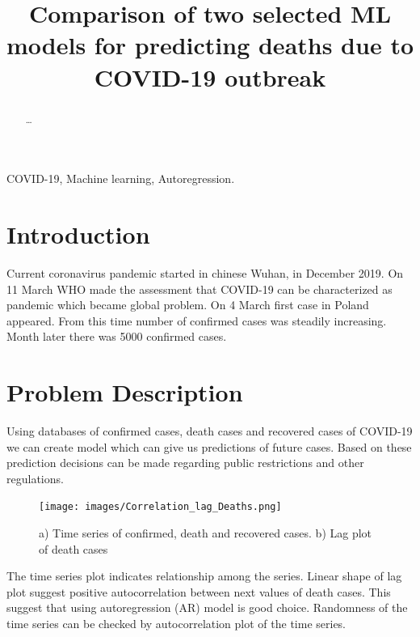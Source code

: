\documentclass[conference]{IEEEtran}
\begin{document}
\title{Comparison of two selected ML models for predicting deaths due to COVID-19 outbreak}

\author{
\and
{}
}


\maketitle

\begin{abstract}
\dots
\end{abstract}

\begin{IEEEkeywords}
COVID-19, Machine learning, Autoregression.
\end{IEEEkeywords}

\section{Introduction}
Current coronavirus pandemic started in chinese Wuhan, in December 2019. On 11 March WHO made the assessment that COVID-19 can be
 characterized as pandemic which became global problem. On 4 March first case in Poland appeared. From this time number of confirmed cases was steadily increasing.
 Month later there was 5000 confirmed cases.

\section{Problem Description}
Using databases of confirmed cases, death cases and recovered cases of COVID-19 we can create model which can give us predictions of future cases.
 Based on these prediction decisions can be made regarding public restrictions and other regulations.

 \begin{figure}[h!]
    \texttt{[image: images/Correlation\_lag\_Deaths.png]}
    \caption{a) Time series of confirmed, death and recovered cases. b) Lag plot of death cases}
    \label{fig:lag_plot}
\end{figure}

The time series plot indicates relationship among the series. Linear shape of lag plot suggest positive autocorrelation between next values of death cases.
 This suggest that using autoregression (AR) model is good choice.
Randomness of the time series can be checked by autocorrelation plot of the time series. 
\end{document}
